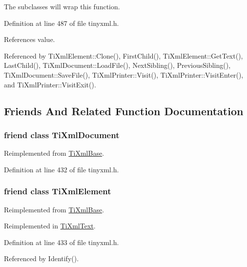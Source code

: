 The subclasses will wrap this function. 

Definition at line 487 of file tinyxml.h.

References value.

Referenced by TiXmlElement::Clone(), FirstChild(), TiXmlElement::GetText(), LastChild(), TiXmlDocument::LoadFile(), NextSibling(), PreviousSibling(), TiXmlDocument::SaveFile(), TiXmlPrinter::Visit(), TiXmlPrinter::VisitEnter(), and TiXmlPrinter::VisitExit().

\subsection{Friends And Related Function Documentation}
\hypertarget{class_ti_xml_node_a173617f6dfe902cf484ce5552b950475}{
\subsubsection[{TiXmlDocument}]{\setlength{\rightskip}{0pt plus 5cm}friend class {\bf TiXmlDocument}}}
\label{class_ti_xml_node_a173617f6dfe902cf484ce5552b950475}


Reimplemented from \hyperlink{class_ti_xml_base_a173617f6dfe902cf484ce5552b950475}{TiXmlBase}.

Definition at line 432 of file tinyxml.h.\hypertarget{class_ti_xml_node_ab6592e32cb9132be517cc12a70564c4b}{
\subsubsection[{TiXmlElement}]{\setlength{\rightskip}{0pt plus 5cm}friend class {\bf TiXmlElement}}}
\label{class_ti_xml_node_ab6592e32cb9132be517cc12a70564c4b}


Reimplemented from \hyperlink{class_ti_xml_base_ab6592e32cb9132be517cc12a70564c4b}{TiXmlBase}.

Reimplemented in \hyperlink{class_ti_xml_text_ab6592e32cb9132be517cc12a70564c4b}{TiXmlText}.

Definition at line 433 of file tinyxml.h.

Referenced by Identify().

